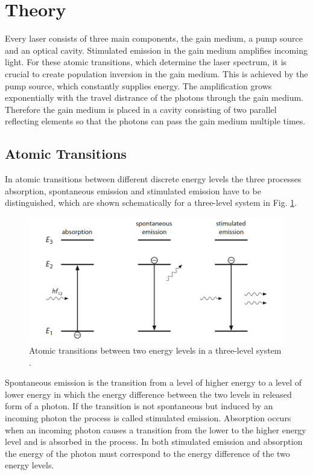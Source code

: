 \section{Theory}
Every laser consists of three main components, the gain medium, a pump source
and an optical cavity. 
Stimulated emission in the gain medium amplifies incoming light. For these atomic transitions,
which determine the laser spectrum, it is crucial to create population inversion in the 
gain medium. This is achieved by the pump source, which constantly supplies energy.
The amplification grows exponentially with the travel distrance of the photons through 
the gain medium. Therefore the gain medium is placed in a cavity consisting of two 
parallel reflecting elements so that the photons can pass the gain medium multiple times.

\subsection*{Atomic Transitions}
In atomic transitions between different discrete energy levels the three processes 
absorption, spontaneous emission and stimulated emission have to be distinguished, which are
shown schematically for a three-level system in Fig. \ref{fig:transitions}.
\begin{figure}
    \centering
    \includegraphics[width = 0.8\linewidth]{Bilder/transitions.png}
    \caption{Atomic transitions between two energy levels in a three-level system \cite{eichler}.}
    \label{fig:transitions}
\end{figure}
Spontaneous emission is the transition from a level of higher energy to a level of lower 
energy in which the energy difference between the two levels in released form of a photon.
If the transition is not spontaneous but induced by an incoming photon the process is 
called stimulated emission. 
Absorption occurs when an incoming photon causes a transition 
from the lower to the higher energy level and is absorbed in the process. 
In both stimulated emission and absorption the energy of the photon must correspond to the energy 
difference of the two energy levels.

